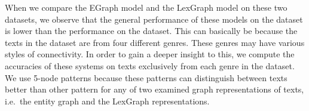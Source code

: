 When we compare the EGraph model and the LexGraph model on these two datasets, we observe that the general performance of these models on the \declercqds dataset is lower than the performance on the \pitlerds dataset. 
This can basically be because the texts in the \declercqds dataset are from four different genres. These genres may have various styles of connectivity.  
In order to gain a deeper insight to this, we compute the accuracies of these systems on texts exclusively from each genre in the \declercqds dataset. 
We use 5-node patterns because these patterns can distinguish between texts better than other pattern for any of two examined graph representations of texts, i.e.\ the entity graph and the \mbox{LexGraph} representations. 



